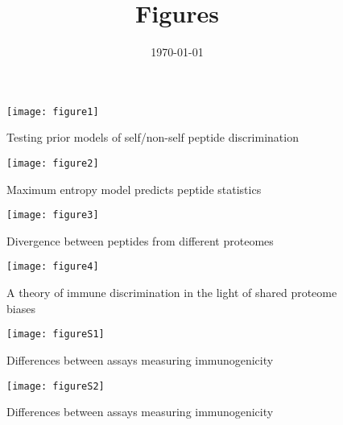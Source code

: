 \documentclass[superscriptaddress,onecolumn,pre]{revtex4}
\newcommand{\<}{\langle}
\renewcommand{\>}{\rangle}
\begin{document}
\title{Figures}
\date{\today}

\maketitle

\begin{figure}
    \texttt{[image: figure1]}
    \caption{Testing prior models of self/non-self peptide discrimination}
\end{figure}

\begin{figure}
    \texttt{[image: figure2]}
    \caption{Maximum entropy model predicts peptide statistics}
\end{figure}


\begin{figure}
    \texttt{[image: figure3]}
    \caption{Divergence between peptides from different proteomes}
\end{figure}

\begin{figure}
    \texttt{[image: figure4]}
    \caption{A theory of immune discrimination in the light of shared proteome biases}
\end{figure}

\begin{figure}
\texttt{[image: figureS1]}
\caption{Differences between assays measuring immunogenicity}
\end{figure}

\begin{figure}
\texttt{[image: figureS2]}
\caption{Differences between assays measuring immunogenicity}
\end{figure}
\end{document}
